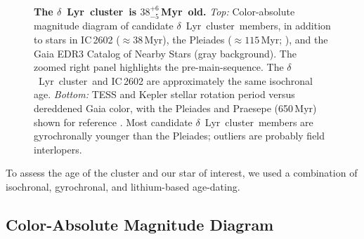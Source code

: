 \documentclass[12pt,modern,twocolumn,tighten]{aastex63}
\newcommand{\cn}{$\delta$\ Lyr\ cluster} %
\newcommand{\clusterage}{$38^{+6}_{-5}$\,Myr} %
\begin{document}
\begin{figure}[tp]
\begin{center}
		\vspace{-0.6cm}
	\end{center}
	\vspace{-0.7cm}
	\caption{
    {\bf The \cn\ is \clusterage\ old.}  {\it Top:} Color-absolute
    magnitude diagram of candidate \cn\ members, in addition to stars
    in IC\,2602 ($\approx38$\,Myr), the Pleiades ($\approx 115$\,Myr;
    \citealt{dahm_2015}), and the Gaia EDR3 Catalog of Nearby Stars
    (gray background).  The zoomed right panel highlights the
    pre-main-sequence.  The \cn\ and IC\,2602 are approximately the
    same isochronal age.  {\it Bottom:} TESS and Kepler stellar
    rotation period versus dereddened Gaia color, with the Pleiades
    and Praesepe (650\,Myr) shown for reference
    \citep{rebull_rotation_2016a,douglas_poking_2017}.  Most candidate
    \cn\ members are gyrochronally younger than the Pleiades; outliers
    are probably field interlopers.
   \label{fig:age}
	}
\end{figure}

To assess the age of the cluster and our star of interest, we used a
combination of isochronal, gyrochronal, and lithium-based
age-dating.

\subsection{Color-Absolute Magnitude Diagram}
\label{sec:camd}
\end{document}
